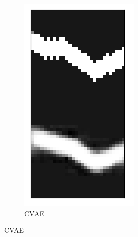 \begin{figure}[t!]
\begin{subfigure}{0.3\columnwidth}
		\includegraphics[width=\linewidth]{img/cvae_tunnel_recon.png}
		\caption{CVAE}
		\label{subfig:cvae_reconstruction}
	\end{subfigure}
	

\end{figure}
